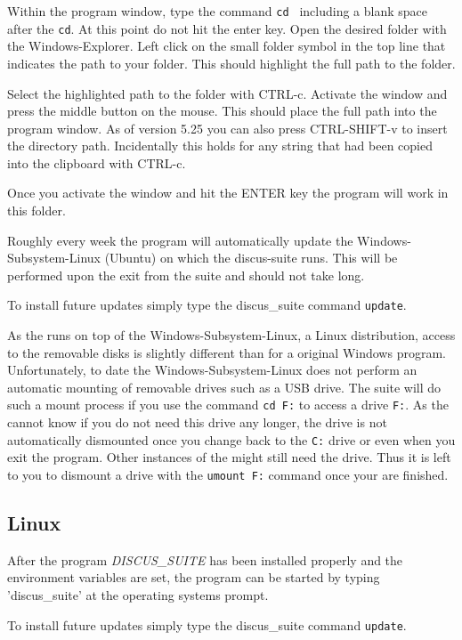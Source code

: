 Within the \Suite program window, type the command {\tt cd } including a
blank space after the {\tt cd}. At this point do not hit the enter key.
Open the desired folder with the Windows-Explorer. Left click on the
small folder symbol in the top line that indicates the path to your
folder. This should highlight the full path to the folder.

Select the highlighted path to the folder
with CTRL-c. Activate the \Suite window and press the
middle button on the mouse. This should place the full path into the
program window. As of version 5.25 you can also press CTRL-SHIFT-v to
insert the directory path. Incidentally this holds for any string that had
been copied into the clipboard with CTRL-c. 

Once you activate the window and hit the ENTER key the program will
work in this folder.

Roughly every week the program will automatically update the 
Windows-Subsystem-Linux (Ubuntu) on which the discus-suite runs. 
This will be performed upon the exit from the suite and should not take long.

To install future updates simply type the discus\_suite command {\tt update}.

As the \Suite runs on top of the Windows-Subsystem-Linux, a Linux distribution,
access to the removable disks is slightly different than for a original Windows 
program. Unfortunately, to date the Windows-Subsystem-Linux does not perform 
an automatic mounting of removable drives such as a USB drive. The suite will
do such a mount process if you use the command {\tt cd F:} to access a drive 
{\tt F:}. As the \Suite cannot know if you do not need this drive any longer, 
the drive is not automatically dismounted once you change back to the {\tt C:}
drive or even when you exit the program. Other instances of the \Suite might still
need the drive. Thus it is left to you to dismount a drive with the 
{\tt umount F:} command once your are finished.

\subsection{Linux}


After the program {\it DISCUS\_SUITE} has been installed properly and the
environment variables are set, the program can be started by typing
'discus\_suite' at the operating systems prompt.

To install future updates simply type the discus\_suite command {\tt update}.

